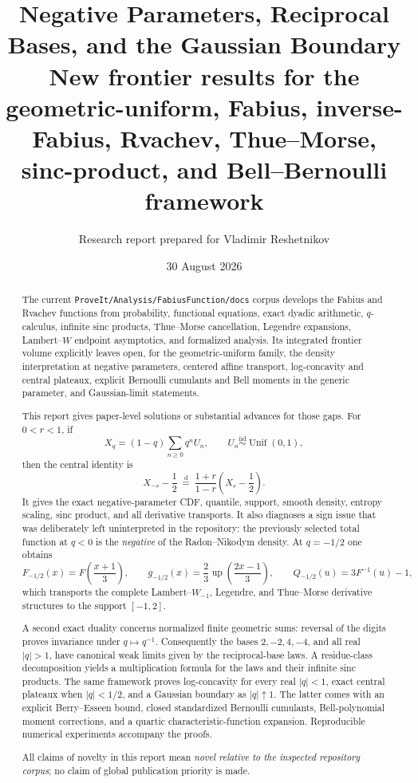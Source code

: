 \documentclass[11pt]{article}
\title{\textbf{Negative Parameters, Reciprocal Bases, and the Gaussian Boundary}\\[2mm]
\large New frontier results for the geometric-uniform, Fabius, inverse-Fabius, Rvachev, Thue--Morse, sinc-product, and Bell--Bernoulli framework}
\author{Research report prepared for Vladimir Reshetnikov}
\date{30 August 2026}
\theoremstyle{definition}
\newcommand{\Up}{\operatorname{up}}
\newcommand{\doteqL}{\mathrel{\stackrel{\mathrm d}=}}
\begin{document}
\maketitle

\begin{abstract}
The current \texttt{ProveIt/Analysis/FabiusFunction/docs} corpus develops the Fabius and
Rvachev functions from probability, functional equations, exact dyadic arithmetic,
$q$-calculus, infinite sinc products, Thue--Morse cancellation, Legendre expansions,
Lambert--$W$ endpoint asymptotics, and formalized analysis.  Its integrated frontier
volume explicitly leaves open, for the geometric-uniform family, the density
interpretation at negative parameters, centered affine transport, log-concavity and
central plateaux, explicit Bernoulli cumulants and Bell moments in the generic
parameter, and Gaussian-limit statements.

This report gives paper-level solutions or substantial advances for those gaps.  For
\(0<r<1\), if
\[
 X_q=(1-q)\sum_{n\ge0}q^nU_n,
 \qquad U_n\stackrel{\mathrm{iid}}\sim\operatorname{Unif}(0,1),
\]
then the central identity is
\[
 X_{-r}-\frac12\ \doteqL\
 \frac{1+r}{1-r}\left(X_r-\frac12\right).
\]
It gives the exact negative-parameter CDF, quantile, support, smooth density, entropy
scaling, sinc product, and all derivative transports.  It also diagnoses a sign issue
that was deliberately left uninterpreted in the repository: the previously selected
total function at \(q<0\) is the \emph{negative} of the Radon--Nikodym density.  At
\(q=-1/2\) one obtains
\[
 F_{-1/2}(x)=F\!\left(\frac{x+1}{3}\right),\qquad
 g_{-1/2}(x)=\frac23\Up\!\left(\frac{2x-1}{3}\right),\qquad
 Q_{-1/2}(u)=3F^{-1}(u)-1,
\]
which transports the complete Lambert--\(W_{-1}\), Legendre, and Thue--Morse derivative
structures to the support \([-1,2]\).

A second exact duality concerns normalized finite geometric sums: reversal of the
digits proves invariance under \(q\mapsto q^{-1}\).  Consequently the bases
\(2,-2,4,-4\), and all real \(\lvert q\rvert>1\), have canonical weak limits given by
the reciprocal-base laws.  A residue-class decomposition yields a multiplication
formula for the laws and their infinite sinc products.  The same framework proves
log-concavity for every real \(\lvert q\rvert<1\), exact central plateaux when
\(\lvert q\rvert<1/2\), and a Gaussian boundary as \(\lvert q\rvert\uparrow1\).  The
latter comes with an explicit Berry--Esseen bound, closed standardized Bernoulli
cumulants, Bell-polynomial moment corrections, and a quartic characteristic-function
expansion.  Reproducible numerical experiments accompany the proofs.

All claims of novelty in this report mean \emph{novel relative to the inspected
repository corpus}; no claim of global publication priority is made.
\end{abstract}
\end{document}
